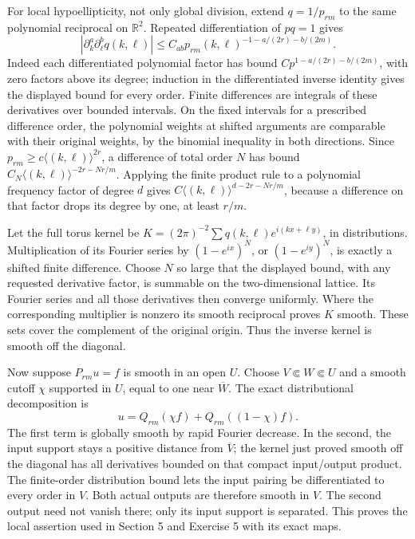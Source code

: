 \documentclass[
  11pt,
]{article}
\begin{document}
For local hypoellipticity, not only global division, extend
\(q=1/p_{rm}\) to the same polynomial reciprocal on \(\mathbb R^2\).
Repeated differentiation of \(pq=1\) gives \[
 |\partial_k^a\partial_\ell^b q(k,\ell)|
     \leq C_{ab}p_{rm}(k,\ell)^{-1-a/(2r)-b/(2m)}.
\tag{IA3}
\] Indeed each differentiated polynomial factor has bound
\(C p^{1-a/(2r)-b/(2m)}\), with zero factors above its degree; induction
in the differentiated inverse identity gives the displayed bound for
every order. Finite differences are integrals of these derivatives over
bounded intervals. On the fixed intervals for a prescribed difference
order, the polynomial weights at shifted arguments are comparable with
their original weights, by the binomial inequality in both directions.
Since \(p_{rm}\geq c\langle(k,\ell)\rangle^{2r}\), a difference of total
order \(N\) has bound \(C_N\langle(k,\ell)\rangle^{-2r-Nr/m}\). Applying
the finite product rule to a polynomial frequency factor of degree \(d\)
gives \(C\langle(k,\ell)\rangle^{d-2r-Nr/m}\), because a difference on
that factor drops its degree by one, at least \(r/m\).

Let the full torus kernel be
\(K=(2\pi)^{-2}\sum q(k,\ell)e^{i(kx+\ell y)}\), in distributions.
Multiplication of its Fourier series by \((1-e^{ix})^N\), or
\((1-e^{iy})^N\), is exactly a shifted finite difference. Choose \(N\)
so large that the displayed bound, with any requested derivative factor,
is summable on the two-dimensional lattice. Its Fourier series and all
those derivatives then converge uniformly. Where the corresponding
multiplier is nonzero its smooth reciprocal proves \(K\) smooth. These
sets cover the complement of the original origin. Thus the inverse
kernel is smooth off the diagonal.

Now suppose \(P_{rm}u=f\) is smooth in an open \(U\). Choose
\(V\Subset W\Subset U\) and a smooth cutoff \(\chi\) supported in \(U\),
equal to one near \(\overline W\). The exact distributional
decomposition is \[
 u=Q_{rm}(\chi f)+Q_{rm}((1-\chi)f).
\tag{IA4}
\] The first term is globally smooth by rapid Fourier decrease. In the
second, the input support stays a positive distance from
\(\overline V\); the kernel just proved smooth off the diagonal has all
derivatives bounded on that compact input/output product. The
finite-order distribution bound lets the input pairing be differentiated
to every order in \(V\). Both actual outputs are therefore smooth in
\(V\). The second output need not vanish there; only its input support
is separated. This proves the local assertion used in Section 5 and
Exercise 5 with its exact maps.
\end{document}
